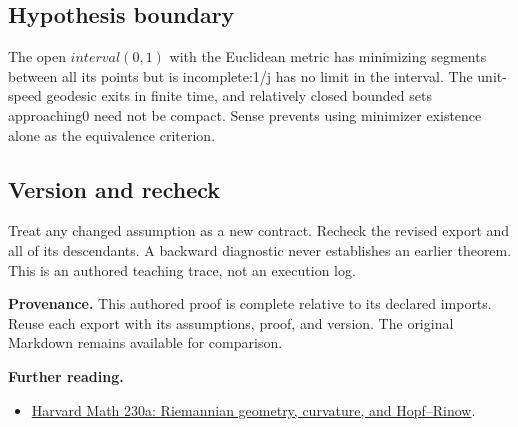 \documentclass[preprint,12pt,aps,pra,showkeys,amsmath,amssymb,superscriptaddress,floatfix]{revtex4-2}
\theoremstyle{definition}
\theoremstyle{remark}
\providecommand{\tightlist}{\setlength{\itemsep}{2pt}\setlength{\parskip}{0pt}}
\begin{document}
\subsection{Hypothesis boundary}
The open \(interval(0,1)\) with the Euclidean metric has minimizing
segments between all its points but is incomplete:1/j has no limit in
the interval. The unit-speed geodesic exits in finite time, and
relatively closed bounded sets approaching0 need not be compact. Sense
prevents using minimizer existence alone as the equivalence criterion.

\subsection{Version and recheck}
Treat any changed assumption as a new contract. Recheck the revised
export and all of its descendants. A backward diagnostic never
establishes an earlier theorem. This is an authored teaching trace, not
an execution log.

\par\medskip\begingroup\small\linespread{1.0}\selectfont\noindent\textbf{Provenance.} This authored proof is complete relative to its declared imports. Reuse
each export with its assumptions, proof, and version. The original
Markdown remains available for comparison.
\par\endgroup

\par\smallskip\begingroup\small\linespread{1.0}\selectfont\noindent\textbf{Further reading.} \begin{itemize}
\tightlist
\item
  \href{https://people.math.harvard.edu/~landesman/assets/math-230a-harvard-differential-geometry-notes.pdf}{Harvard
  Math 230a: Riemannian geometry, curvature, and Hopf--Rinow}.
\end{itemize}\par\endgroup
\end{document}
